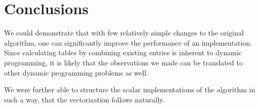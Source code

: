 \section{Conclusions}

We could demonstrate that with few relatively simple changes to the original
algorithm, one can significantly improve the performance of an implementation.
Since calculating tables by combining existing entries is inherent to dynamic
programming, it is likely that the observations we made can be translated to
other dynamic programming problems as well.

We were further able to structure the scalar implementations of the algorithm in
such a way, that the vectorization follows naturally.


